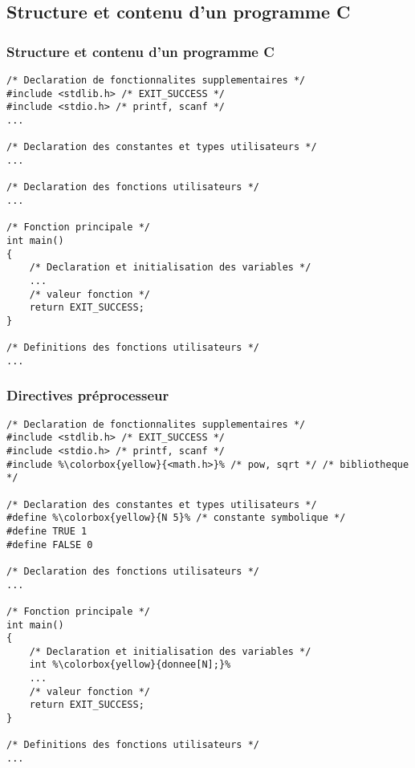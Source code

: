 \documentclass[xcolor=svgnames]{beamer}
\begin{document}
  \subsection{Structure et contenu d'un programme C}
\begin{frame}[fragile]
  \frametitle{Structure et contenu d'un programme C}
\begin{lstlisting}[basicstyle=\ttfamily\scriptsize,escapechar={\%}] 
/* Declaration de fonctionnalites supplementaires */
#include <stdlib.h> /* EXIT_SUCCESS */
#include <stdio.h> /* printf, scanf */
...

/* Declaration des constantes et types utilisateurs */
...

/* Declaration des fonctions utilisateurs */
...

/* Fonction principale */
int main()
{
    /* Declaration et initialisation des variables */
    ...
    /* valeur fonction */
    return EXIT_SUCCESS;
}

/* Definitions des fonctions utilisateurs */
...
\end{lstlisting}
\end{frame}

\begin{frame}[fragile]
  \frametitle{Directives préprocesseur}

\begin{lstlisting}[basicstyle=\ttfamily\scriptsize,escapechar={\%}] 
/* Declaration de fonctionnalites supplementaires */
#include <stdlib.h> /* EXIT_SUCCESS */
#include <stdio.h> /* printf, scanf */
#include %\colorbox{yellow}{<math.h>}% /* pow, sqrt */ /* bibliotheque */

/* Declaration des constantes et types utilisateurs */
#define %\colorbox{yellow}{N 5}% /* constante symbolique */
#define TRUE 1
#define FALSE 0

/* Declaration des fonctions utilisateurs */
...

/* Fonction principale */
int main()
{
    /* Declaration et initialisation des variables */
    int %\colorbox{yellow}{donnee[N];}%
    ...
    /* valeur fonction */
    return EXIT_SUCCESS;
}

/* Definitions des fonctions utilisateurs */
...
\end{lstlisting}
\end{frame}
\end{document}
